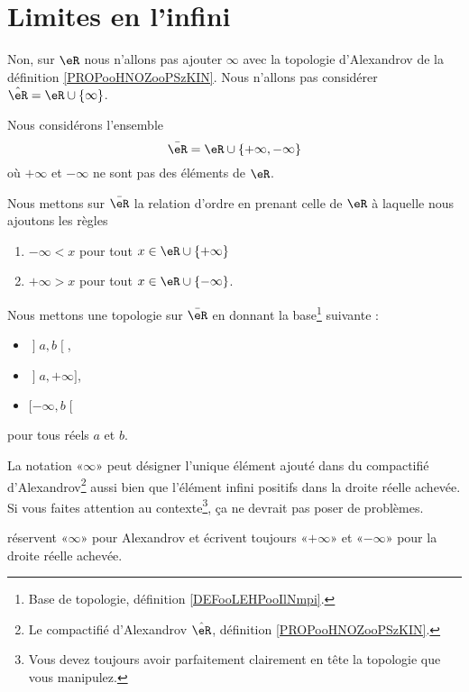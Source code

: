 \section{Limites en l'infini}

Non, sur \( \eR\) nous n'allons pas ajouter \( \infty\) avec la topologie d'Alexandrov de la définition \ref{PROPooHNOZooPSzKIN}. Nous n'allons pas considérer \( \hat \eR=\eR\cup\{ \infty \}\).

\begin{definition}        \label{DEFooRUyiBSUooALDDOa}
	Nous considérons l'ensemble
	\begin{equation}
		\bar \eR=\eR\cup\{ +\infty,-\infty \}
	\end{equation}
	où \( +\infty\) et \( -\infty\) ne sont pas des éléments de \( \eR\).

	Nous mettons sur \( \bar\eR\) la relation d'ordre en prenant celle de \( \eR\) à laquelle nous ajoutons les règles
	\begin{enumerate}
		\item
		      \( -\infty<x\) pour tout \( x\in\eR\cup\{ +\infty \}\)
		\item
		      \( +\infty>x\) pour tout \( x\in \eR\cup\{ -\infty \}\).
	\end{enumerate}

	Nous mettons une topologie sur \( \bar\eR\) en donnant la base\footnote{Base de topologie, définition \ref{DEFooLEHPooIlNmpi}.} suivante :
	\begin{itemize}
		\item \( \mathopen] a , b \mathclose[\),
		\item \( \mathopen] a , +\infty \mathclose]\),
		\item \( \mathopen[ -\infty , b \mathclose[\)
	\end{itemize}
	pour tous réels \( a\) et \( b\).
\end{definition}

\begin{normaltext}
    La notation «\( \infty\)» peut désigner l'unique élément ajouté dans du compactifié d'Alexandrov\footnote{Le compactifié d'Alexandrov \( \hat \eR\), définition \ref{PROPooHNOZooPSzKIN}.} aussi bien que l'élément infini positifs dans la droite réelle achevée. Si vous faites attention au contexte\footnote{Vous devez toujours avoir parfaitement clairement en tête la topologie que vous manipulez.}, ça ne devrait pas poser de problèmes.

     réservent «\( \infty\)» pour Alexandrov et écrivent toujours «\( +\infty\)» et «\( -\infty\)» pour la droite réelle achevée.
\end{normaltext}

